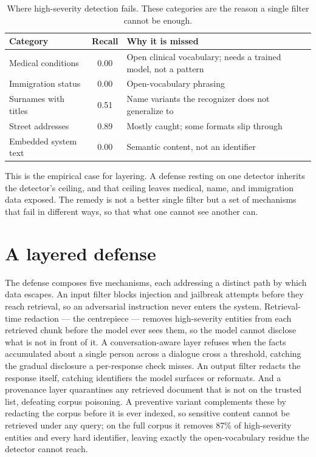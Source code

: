 \documentclass[11pt,a4paper]{article}
\begin{document}
\begin{table}[h]
\centering
\caption{Where high-severity detection fails. These categories are the reason a single filter cannot
be enough.}
\label{tab:blindspots}
\begin{tabular}{lcp{7.4cm}}
\toprule
\textbf{Category} & \textbf{Recall} & \textbf{Why it is missed}\\
\midrule
Medical conditions & 0.00 & Open clinical vocabulary; needs a trained model, not a pattern\\
Immigration status & 0.00 & Open-vocabulary phrasing\\
Surnames with titles & 0.51 & Name variants the recognizer does not generalize to\\
Street addresses & 0.89 & Mostly caught; some formats slip through\\
Embedded system text & 0.00 & Semantic content, not an identifier\\
\bottomrule
\end{tabular}
\end{table}

This is the empirical case for layering. A defense resting on one detector inherits the detector's
ceiling, and that ceiling leaves medical, name, and immigration data exposed. The remedy is not a
better single filter but a set of mechanisms that fail in different ways, so that what one cannot see
another can.

\section{A layered defense}
\label{sec:defense}

The defense composes five mechanisms, each addressing a distinct path by which data escapes. An input
filter blocks injection and jailbreak attempts before they reach retrieval, so an adversarial
instruction never enters the system. Retrieval-time redaction --- the centrepiece --- removes
high-severity entities from each retrieved chunk before the model ever sees them, so the model cannot
disclose what is not in front of it. A conversation-aware layer refuses when the facts accumulated about
a single person across a dialogue cross a threshold, catching the gradual disclosure a per-response
check misses. An output filter redacts the response itself, catching identifiers the model surfaces or
reformats. And a provenance layer quarantines any retrieved document that is not on the trusted list,
defeating corpus poisoning. A preventive variant complements these by redacting the corpus before it is
ever indexed, so sensitive content cannot be retrieved under any query; on the full corpus it removes
87\% of high-severity entities and every hard identifier, leaving exactly the open-vocabulary residue
the detector cannot reach.
\end{document}
